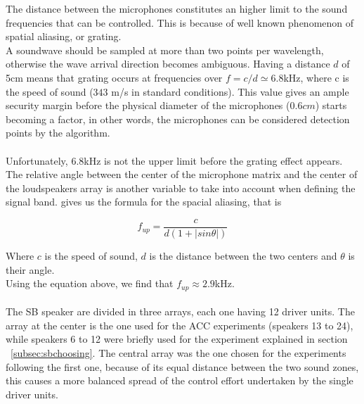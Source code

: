 The distance between the microphones constitutes an higher limit to the sound frequencies that can be controlled. This is because of well known phenomenon of spatial aliasing, or grating.
\\
A soundwave should be sampled at more than two points per wavelength, otherwise the wave arrival direction becomes ambiguous. Having a distance $d$ of 5cm means that grating occurs at frequencies over $f = c/d \simeq 6.8$kHz, where c is the speed of sound ($343$ m/s in standard conditions). This value gives an ample security margin before the physical diameter of the microphones ($0.6 cm$) starts becoming a factor, in other words, the microphones can be considered detection points by the algorithm. 
\\
\\
Unfortunately, $6.8$kHz is not the upper limit before the grating effect appears. The relative angle between the center of the microphone matrix and the center of the loudspeakers array is another variable to take into account when defining the signal band. \parencite{cai_time-domain_2014} gives us the formula for the spacial aliasing, that is

\begin{equation}
f_{up}=\frac{c}{d(1+|sin \theta|)}
\label{eqn:freqaliasing}
\end{equation}

Where $c$ is the speed of sound, $d$ is the distance between the two centers and $\theta$ is their angle.
\\
Using the equation above, we find that $f_{up} \approx 2.9$kHz.
\\
\\
The SB speaker are divided in three arrays, each one having 12 driver units. The array at the center is the one used for the ACC experiments (speakers 13 to 24), while speakers 6 to 12 were briefly used for the experiment explained in section ~\ref{subsec:sbchoosing}. The central array was the one chosen for the experiments following the first one, because of its equal distance between the two sound zones, this causes a more balanced spread of the control effort undertaken by the single driver units.

